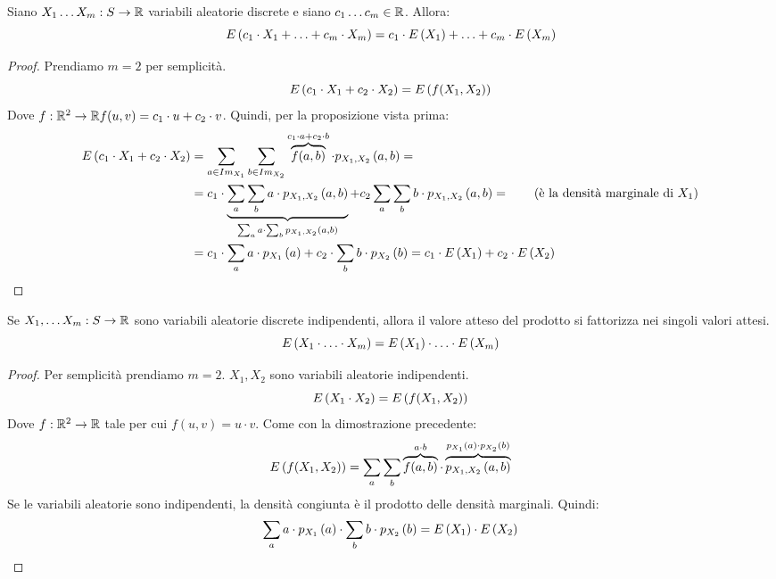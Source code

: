 \begin{prop}
Siano $X_1 \ldots X_m : S \to \reals$ variabili aleatorie discrete e siano $c_1 \ldots c_m \in \reals$. Allora:
\[
\expect{c_1 \cdot X_1 + \ldots + c_m \cdot X_m} = c_1 \cdot \expect{X_1} + \ldots + c_m \cdot \expect{X_m}
\]
\end{prop}
\begin{proof}
Prendiamo $m = 2$ per semplicit\`a.
\[
\expect{c_1 \cdot X_1 + c_2 \cdot X_2} = \expect{f(X_1,X_2)}
\]
Dove $f : \reals^2 \to \reals f(u,v) = c_1 \cdot u + c_2 \cdot v$. Quindi, per la proposizione vista prima:
\begin{align*}
\expect{c_1 \cdot X_1 + c_2 \cdot X_2} &=
\sum_{a \in \image{X_1}} \sum_{b \in \image{X_2}} \overbrace{f(a,b)}^{c_1 \cdot a + c_2 \cdot b} \cdot \mass[X_1, X_2]{a,b} = \\
&= c_1 \cdot \underbrace{\sum_{a} \sum_{b} a \cdot \mass[X_1,X_2]{a,b}}_{\sum_{a} a \cdot \sum_{b} \mass[X_1,X_2]{a,b}} + c_2 \sum_{a} \sum_{b} b \cdot \mass[X_1,X_2]{a,b} = \tag{\`e la densit\`a marginale di $X_1$} \\
&= c_1 \cdot \sum_{a} a \cdot \mass[X_1]{a} + c_2 \cdot \sum_{b} b \cdot \mass[X_2]{b} = 
c_1 \cdot \expect{X_1} + c_2 \cdot \expect{X_2}
\end{align*}
\end{proof}
\begin{prop}\label{prodotto_variabili_indipendenti}
Se $X_1, \ldots X_m : S \to \reals$ sono variabili aleatorie discrete indipendenti, allora il valore atteso del prodotto si fattorizza nei singoli valori attesi.
\[
\expect{X_1 \cdot \ldots \cdot X_m} = \expect{X_1} \cdot \ldots \cdot \expect{X_m}
\]
\end{prop}
\begin{proof}
Per semplicit\`a prendiamo $m = 2$. $X_1, X_2$ sono variabili aleatorie indipendenti.
\[
\expect{X_1 \cdot X_2} = \expect{f(X_1,X_2)}
\]
Dove $f : \reals^2 \to \reals$ tale per cui $f(u,v) = u \cdot v$. Come con la dimostrazione precedente:
\[
\expect{f(X_1, X_2)} = \sum_{a} \sum_{b} \overbrace{f(a,b)}^{a \cdot b} \cdot \overbrace{\mass[X_1,X_2]{a,b}}^{\mass[X_1]{a} \cdot \mass[X_2]{b}}
\]
Se le variabili aleatorie sono indipendenti, la densit\`a congiunta \`e il prodotto delle densit\`a marginali. Quindi:
\[
\sum_{a} a \cdot \mass[X_1]{a} \cdot \sum_{b} b \cdot \mass[X_2]{b} =
\expect{X_1} \cdot \expect{X_2}
\]
\end{proof}

